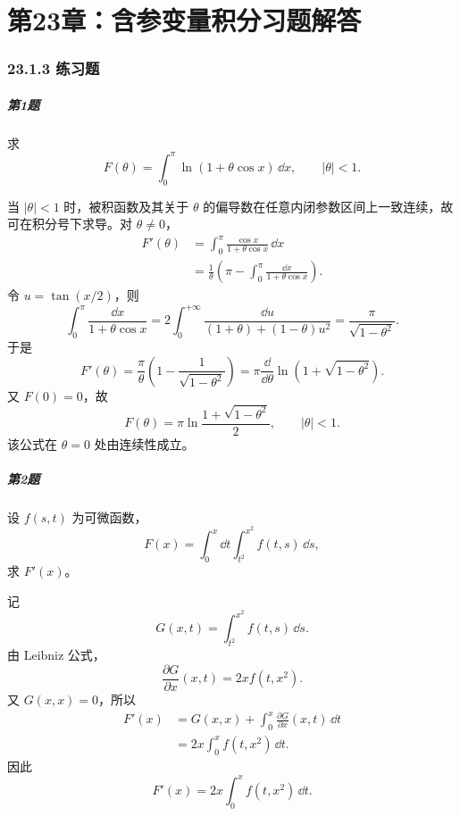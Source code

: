 
\chapter*{第23章：含参变量积分习题解答}
\subsection*{23.1.3 练习题}

\paragraph{第1题}
求
\[
F(\theta)=\int_0^\pi\ln(1+\theta\cos x)\,\dd x,
\qquad |\theta|<1.
\]

\begin{xsolution}
当 $|\theta|<1$ 时，被积函数及其关于 $\theta$ 的偏导数在任意内闭参数区间上一致连续，故可在积分号下求导。对 $\theta\neq0$，
\[
\begin{aligned}
F'(\theta)
&=\int_0^\pi\frac{\cos x}{1+\theta\cos x}\,\dd x\\
&=\frac1\theta\left(\pi-\int_0^\pi\frac{\dd x}{1+\theta\cos x}\right).
\end{aligned}
\]
令 $u=\tan(x/2)$，则
\[
\int_0^\pi\frac{\dd x}{1+\theta\cos x}
=2\int_0^{+\infty}\frac{\dd u}{(1+\theta)+(1-\theta)u^2}
=\frac\pi{\sqrt{1-\theta^2}}.
\]
于是
\[
F'(\theta)=\frac\pi\theta\left(1-\frac1{\sqrt{1-\theta^2}}\right)
=\pi\frac{\dd}{\dd\theta}\ln\left(1+\sqrt{1-\theta^2}\right).
\]
又 $F(0)=0$，故
\[
\boxed{F(\theta)=\pi\ln\frac{1+\sqrt{1-\theta^2}}2},
\qquad |\theta|<1.
\]
该公式在 $\theta=0$ 处由连续性成立。
\end{xsolution}

\paragraph{第2题}
设 $f(s,t)$ 为可微函数，
\[
F(x)=\int_0^x\dd t\int_{t^2}^{x^2}f(t,s)\,\dd s,
\]
求 $F'(x)$。

\begin{xsolution}
记
\[
G(x,t)=\int_{t^2}^{x^2}f(t,s)\,\dd s.
\]
由 Leibniz 公式，
\[
\frac{\partial G}{\partial x}(x,t)=2x f(t,x^2).
\]
又 $G(x,x)=0$，所以
\[
\begin{aligned}
F'(x)
&=G(x,x)+\int_0^x\frac{\partial G}{\partial x}(x,t)\,\dd t\\
&=2x\int_0^x f(t,x^2)\,\dd t.
\end{aligned}
\]
因此
\[
\boxed{F'(x)=2x\int_0^x f(t,x^2)\,\dd t}.
\]
\end{xsolution}


